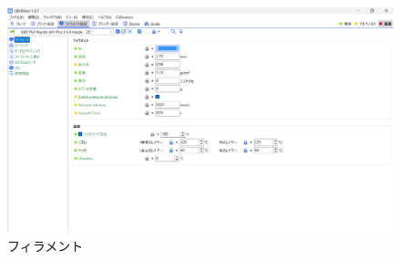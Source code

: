 \begin{figure}[H]
	\centering
		\includegraphics[scale=0.25]{./figure/設定4.png}
		\caption{フィラメント}
		\label{fig:slice4}
\end{figure}

\newpage

